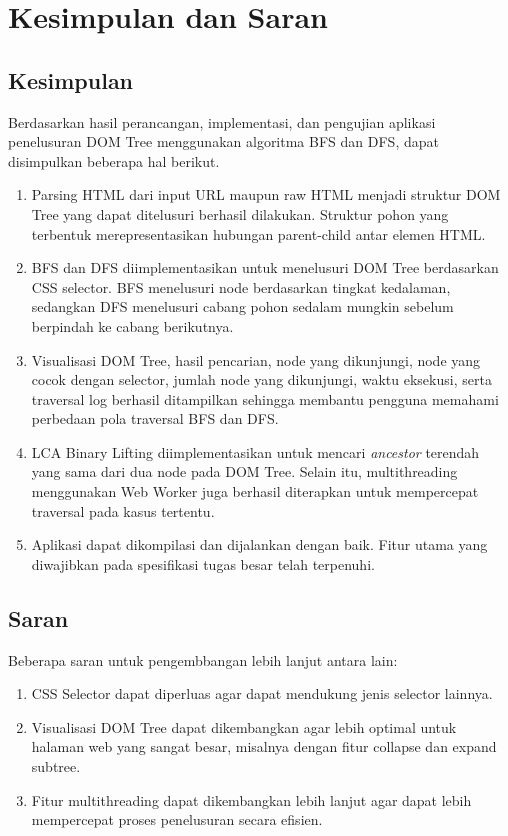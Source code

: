 \chapter{Kesimpulan dan Saran}

\section{Kesimpulan}

Berdasarkan hasil perancangan, implementasi, dan pengujian aplikasi penelusuran DOM Tree menggunakan algoritma BFS dan DFS, dapat disimpulkan beberapa hal berikut.

\begin{enumerate}
    \item Parsing HTML dari input URL maupun raw HTML menjadi struktur DOM Tree yang dapat ditelusuri berhasil dilakukan. Struktur pohon yang terbentuk merepresentasikan hubungan parent-child antar elemen HTML.

    \item BFS dan DFS diimplementasikan untuk menelusuri DOM Tree berdasarkan CSS selector. BFS menelusuri node berdasarkan tingkat kedalaman, sedangkan DFS menelusuri cabang pohon sedalam mungkin sebelum berpindah ke cabang berikutnya.

    \item Visualisasi DOM Tree, hasil pencarian, node yang dikunjungi, node yang cocok dengan selector, jumlah node yang dikunjungi, waktu eksekusi, serta traversal log berhasil ditampilkan sehingga membantu pengguna memahami perbedaan pola traversal BFS dan DFS.

    \item LCA Binary Lifting diimplementasikan untuk mencari \textit{ancestor} terendah yang sama dari dua node pada DOM Tree. Selain itu, multithreading menggunakan Web Worker juga berhasil diterapkan untuk mempercepat traversal pada kasus tertentu.

    \item Aplikasi dapat dikompilasi dan dijalankan dengan baik. Fitur utama yang diwajibkan pada spesifikasi tugas besar telah terpenuhi.
\end{enumerate}

\section{Saran}

Beberapa saran untuk pengembbangan lebih lanjut antara lain:

\begin{enumerate}
    \item CSS Selector dapat diperluas agar dapat mendukung jenis selector lainnya.

    \item Visualisasi DOM Tree dapat dikembangkan agar lebih optimal untuk halaman web yang sangat besar, misalnya dengan fitur collapse dan expand subtree.

    \item Fitur multithreading dapat dikembangkan lebih lanjut agar dapat lebih mempercepat proses penelusuran secara efisien.
\end{enumerate}

